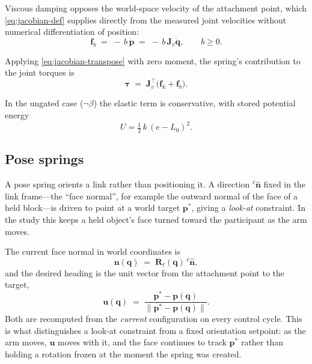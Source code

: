 Viscous damping opposes the world-space velocity of the attachment point, which
\eqref{eq:jacobian-def} supplies directly from the measured joint velocities
without numerical differentiation of position:
%
\begin{equation}
  \bm{f}_{b} \;=\; -\,b\,\dot{\bm{p}} \;=\; -\,b\,\bm{J}_{v}\dot{\bm{q}},
  \qquad b \ge 0.
  \label{eq:linear-damping}
\end{equation}

Applying \eqref{eq:jacobian-transpose} with zero moment, the spring's
contribution to the joint torques is
%
\begin{equation}
  \boxed{\;\bm{\tau} \;=\; \bm{J}_{v}^{\top}\bigl(\bm{f}_{k} + \bm{f}_{b}\bigr).\;}
  \label{eq:linear-torque}
\end{equation}

In the ungated case ($\neg\beta$) the elastic term is conservative, with stored
potential energy
%
\begin{equation}
  U = \tfrac{1}{2}\,k\,(e - L_{0})^{2}.
\end{equation}

\subsection{Pose springs}
\label{sec:pose-spring}

A pose spring orients a link rather than positioning it. A direction
${}^{\ell}\hat{\bm{n}}$ fixed in the link frame---the ``face normal'', for
example the outward normal of the face of a held block---is driven to point at
a world target $\bm{p}^{*}$, giving a \emph{look-at} constraint. In the study
this keeps a held object's face turned toward the participant as the arm moves.

The current face normal in world coordinates is
%
\begin{equation}
  \bm{n}(\bm{q}) \;=\; \bm{R}_{\ell}(\bm{q})\,{}^{\ell}\hat{\bm{n}},
\end{equation}
%
and the desired heading is the unit vector from the attachment point to the
target,
%
\begin{equation}
  \bm{u}(\bm{q}) \;=\;
  \frac{\bm{p}^{*} - \bm{p}(\bm{q})}{\lVert\bm{p}^{*} - \bm{p}(\bm{q})\rVert}.
  \label{eq:pose-desired}
\end{equation}
%
Both are recomputed from the \emph{current} configuration on every control
cycle. This is what distinguishes a look-at constraint from a fixed orientation
setpoint: as the arm moves, $\bm{u}$ moves with it, and the face continues to
track $\bm{p}^{*}$ rather than holding a rotation frozen at the moment the
spring was created.

